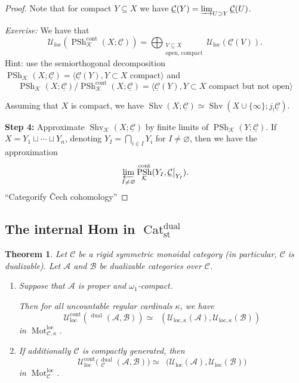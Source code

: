 \documentclass[draft]{amsart}
\newcommand{\ul}[1]{\underline{#1}}
\newcommand{\cat}[1]{\mathcal{#1}}
\newcommand{\sheaf}[1]{\mathcal{#1}}
\renewcommand{\emptyset}{\varnothing}
\DeclareMathOperator{\iHom}{\ul{Hom}}
\DeclareMathOperator{\Shv}{Shv}
\DeclareMathOperator{\Cat}{Cat}
\DeclareMathOperator{\PSh}{PSh}
\DeclareMathOperator{\Mot}{Mot}
\newtheorem{thm}{Theorem}[section]
\theoremstyle{definition}
\begin{document}
\begin{proof}
Note that for compact $Y\subseteq X$ we have $\ul{\cat C}(Y) = \varinjlim_{U\supset Y} \ul{\cat C}(U)$.

\textit{Exercise:} We have that 
\[
\sheaf U_{\mathrm{loc}}(\PSh^{\mathrm{cont}}_{\sheaf K}(X;\ul{\cat C}))
= \bigoplus_{\substack{V\subseteq X\\ \text{open, compact}}} \sheaf U_{\mathrm{loc}}(\ul{\cat C}(V)).
\]
Hint: use the semiorthogonal decomposition $\PSh_{\sheaf K}(X;\ul{\cat C}) = \langle \ul{\cat C}(Y), Y\subset X \text{ compact}\rangle$ and
\[
\PSh_{\sheaf K}(X;\ul{\cat C})/\PSh_{\sheaf K}^{\mathrm{cont}}(X;\ul{\cat C}) = \langle \ul{\cat C}(Y), \text{$Y\subset X$ compact but not open}\rangle
\]


Assuming that $X$ is compact, we have $\Shv(X;\ul{\cat C}) \simeq \Shv(X\cup\{\infty\}; j_!\ul{\cat C})$.

\textbf{Step 4:} Approximate $\Shv_{\sheaf K}(X;\ul{\cat C})$ by finite limits of $\PSh_{\sheaf K}(Y;\ul{\cat C})$. If $X = Y_1 \sqcup \dotsb \sqcup Y_n$, denoting $Y_I = \bigcap_{i\in I}Y_i$ for $I\neq \emptyset$, then we have the approximation
\[
\varprojlim_{I\neq \emptyset} \PSh^{\mathrm{cont}}_{\sheaf K}(Y_I, \ul{\cat C}\big|_{Y_I}).
\]
\enquote{Categorify \v{C}ech cohomology}
\end{proof}

\subsection{The internal Hom in \texorpdfstring{$\Cat^{\mathrm{dual}}_{\mathrm{st}}$}{Cat perf dual}}

\begin{thm}
Let $\cat C$ be a rigid symmetric monoidal category (in particular, $\cat C$ is dualizable). Let $\cat A$ and $\cat B$ be dualizable categories over $\cat C$. 

\begin{enumerate}[(1)]
\item Suppose that $\cat A$ is proper and $\omega_1$-compact. 

Then for all uncountable regular cardinals $\kappa$, we have
\[
\sheaf U_{\mathrm{loc}}^{\mathrm{cont}}(\iHom^{\mathrm{dual}}(\cat A, \cat B)) \simeq \iHom(\sheaf U_{\mathrm{loc}, \kappa}(\cat A), \sheaf U_{\mathrm{loc},\kappa} (\cat B))
\]
in $\Mot_{\cat C, \kappa}^{\mathrm{loc}}$.

\item If additionally $\cat C$ is compactly generated, then
\[
\sheaf U_{\mathrm{loc}}^{\mathrm{cont}} \bigl(\iHom_{\cat C}^{\mathrm{dual}} (\cat A, \cat B)\bigr) \simeq \iHom\bigl(\sheaf U_{\mathrm{loc}}(\cat A), \sheaf U_{\mathrm{loc}}(\cat B)\bigr)
\]
in $\Mot_{\cat C}^{\mathrm{loc}}$.
\end{enumerate}
\end{thm}
\end{document}
